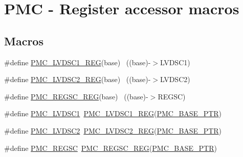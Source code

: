 \hypertarget{group___p_m_c___register___accessor___macros}{}\section{P\+MC -\/ Register accessor macros}
\label{group___p_m_c___register___accessor___macros}
\subsection*{Macros}
\begin{DoxyCompactItemize}
\item 
\#define \hyperlink{group___p_m_c___register___accessor___macros_ga2fe280fb8b910471c6a1308e8507dd25}{P\+M\+C\+\_\+\+L\+V\+D\+S\+C1\+\_\+\+R\+EG}(base)                                      ~((base)-\/$>$L\+V\+D\+S\+C1)
\item 
\#define \hyperlink{group___p_m_c___register___accessor___macros_ga4df6ab8710ac0dd4d7dd3a316de354c8}{P\+M\+C\+\_\+\+L\+V\+D\+S\+C2\+\_\+\+R\+EG}(base)                                      ~((base)-\/$>$L\+V\+D\+S\+C2)
\item 
\#define \hyperlink{group___p_m_c___register___accessor___macros_gababe9178e390666706c6a7f23b1dccb2}{P\+M\+C\+\_\+\+R\+E\+G\+S\+C\+\_\+\+R\+EG}(base)                                        ~((base)-\/$>$R\+E\+G\+SC)
\item 
\#define \hyperlink{group___p_m_c___register___accessor___macros_gae9e90b7b2d3c4f5e0950d074fecb2798}{P\+M\+C\+\_\+\+L\+V\+D\+S\+C1}~\hyperlink{group___p_m_c___register___accessor___macros_ga2fe280fb8b910471c6a1308e8507dd25}{P\+M\+C\+\_\+\+L\+V\+D\+S\+C1\+\_\+\+R\+EG}(\hyperlink{group___p_m_c___peripheral_gaf32df9f1096263f10a5e8978a338b2ac}{P\+M\+C\+\_\+\+B\+A\+S\+E\+\_\+\+P\+TR})
\item 
\#define \hyperlink{group___p_m_c___register___accessor___macros_ga921b48d20e5bc7e7353ac2f59c8135ba}{P\+M\+C\+\_\+\+L\+V\+D\+S\+C2}~\hyperlink{group___p_m_c___register___accessor___macros_ga4df6ab8710ac0dd4d7dd3a316de354c8}{P\+M\+C\+\_\+\+L\+V\+D\+S\+C2\+\_\+\+R\+EG}(\hyperlink{group___p_m_c___peripheral_gaf32df9f1096263f10a5e8978a338b2ac}{P\+M\+C\+\_\+\+B\+A\+S\+E\+\_\+\+P\+TR})
\item 
\#define \hyperlink{group___p_m_c___register___accessor___macros_gad80edb8f69da1769b7367108d8c4f9be}{P\+M\+C\+\_\+\+R\+E\+G\+SC}~\hyperlink{group___p_m_c___register___accessor___macros_gababe9178e390666706c6a7f23b1dccb2}{P\+M\+C\+\_\+\+R\+E\+G\+S\+C\+\_\+\+R\+EG}(\hyperlink{group___p_m_c___peripheral_gaf32df9f1096263f10a5e8978a338b2ac}{P\+M\+C\+\_\+\+B\+A\+S\+E\+\_\+\+P\+TR})
\end{DoxyCompactItemize}


